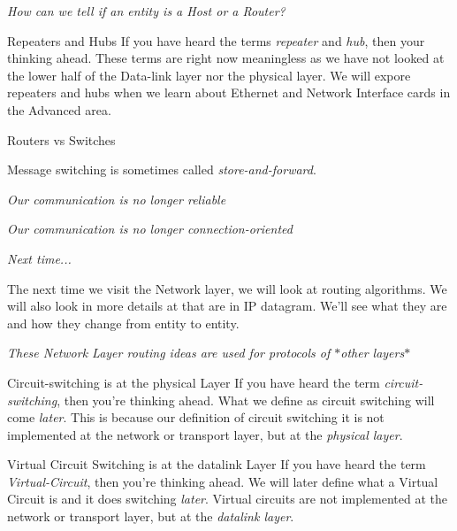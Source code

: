 \frmrule

\textit{How can we tell if an entity is a Host or a Router?}


\frmrule

\begin{sidenote}{Repeaters and Hubs}
If you have heard the terms \textit{repeater} and \textit{hub}, then 
your thinking ahead. These terms are right now meaningless 
as we have not looked at the lower half of the Data-link layer 
nor the physical layer. We will expore repeaters and hubs 
when we learn about Ethernet and Network Interface cards in the 
Advanced area. 
\end{sidenote}

\begin{sidenote}{Routers vs Switches}
\end{sidenote}

\frmrule


Message switching is sometimes called \textit{store-and-forward}. 


\frmrule

\textit{Our communication is no longer reliable}

\frmrule

\textit{Our communication is no longer connection-oriented}

\frmrule

\textit{Next time...}

The next time we visit the Network layer, we will 
look at routing algorithms. We will also look 
in more details at  that are in IP datagram. 
We'll see what they are and how they change from entity to entity.

\frmrule

\textit{These Network Layer routing ideas are used for protocols of $*$other layers$*$}

\begin{sidenote}{Circuit-switching is at the physical Layer}
If you have heard the term \textit{circuit-switching}, then 
you're thinking ahead. What we define as circuit switching 
will come \textit{later}. This is because our definition of 
circuit switching it is not implemented at the network 
or transport layer, but at the \textit{physical layer}. 
\end{sidenote}

\begin{sidenote}{Virtual Circuit Switching is at the datalink Layer}
If you have heard the term \textit{Virtual-Circuit}, then 
you're thinking ahead. We will later define 
what a Virtual Circuit is and it does switching \textit{later}.
Virtual circuits are not implemented at the network 
or transport layer, but at the \textit{datalink layer}. 
\end{sidenote}



